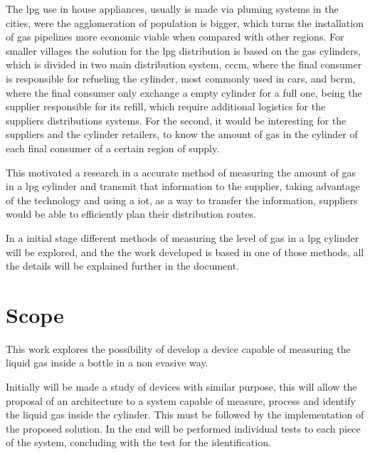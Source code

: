 The \acrshort{lpg} use in house appliances, usually is made via pluming systems in the cities, were the agglomeration of population is bigger, which turns the installation of gas pipelines more economic viable when compared with other regions. For smaller villages the solution for the \acrshort{lpg} distribution is based on the gas cylinders, which is divided in two main distribution system, \acrlong{cccm}, where the final consumer is responsible for refueling the cylinder, most commonly used in cars, and \acrlong{bcrm}, where the final consumer only exchange a empty cylinder for a full one, being the supplier responsible for its refill, which require additional logistics for the suppliers distributions systems. For the second, it would be interesting for the suppliers and the cylinder retailers, to know the amount of gas in the cylinder of each final consumer of a certain region of supply.

This motivated a research in a accurate method of measuring the amount of gas in a \acrshort{lpg} cylinder and transmit that information to the supplier, taking advantage of the technology and using a \acrshort{iot}, as a way to transfer the information, suppliers would be able to efficiently plan their distribution routes. 

In a initial stage different methods of measuring the level of gas in a \acrshort{lpg} cylinder will be explored, and the the work developed is based in one of those methods, all the details will be explained further in the document.

\section{Scope}
This work explores the possibility of develop a device capable of measuring the liquid gas inside a bottle in a non evasive way. 

Initially will be made a study of devices with similar purpose, this will allow the proposal of an architecture to a system capable of measure, process and identify the liquid gas inside the cylinder. This must be followed by the implementation of the proposed solution. In the end will be performed individual tests to each piece of the system, concluding with the test for the identification. 

